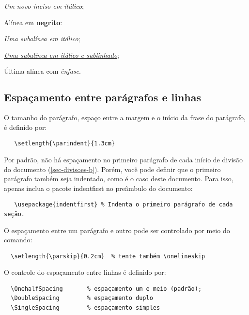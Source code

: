 \begin{alineas}
  \begin{incisos}
    \item \textit{Um novo inciso em itálico};
  \end{incisos}
  
  \item Alínea em \textbf{negrito}:
  
  \begin{subalineas}
    \item \textit{Uma subalínea em itálico};
    \item \underline{\textit{Uma subalínea em itálico e sublinhado}}; 
  \end{subalineas}
  
  \item Última alínea com \emph{ênfase}.
  
\end{alineas}

\subsection{Espaçamento entre parágrafos e linhas}\label{sec_espacamento}

O tamanho do parágrafo, espaço entre a margem
e o início da frase do parágrafo, é definido por:

\begin{verbatim}
   \setlength{\parindent}{1.3cm}
\end{verbatim}

Por padrão, não há espaçamento no
primeiro parágrafo de cada início de divisão do documento
(\autoref{sec-divisoes-b}). Porém, você pode definir que o primeiro parágrafo
também seja indentado, como é o caso deste documento. Para isso, apenas inclua o
pacote \textsf{indentfirst} no preâmbulo do documento:

\begin{verbatim}
   \usepackage{indentfirst} % Indenta o primeiro parágrafo de cada seção.
\end{verbatim}

O espaçamento entre um parágrafo e outro
pode ser controlado por meio do comando:

\begin{verbatim}
  \setlength{\parskip}{0.2cm}  % tente também \onelineskip
\end{verbatim}

O controle do espaçamento entre linhas é
definido por:
\begin{verbatim}
  \OnehalfSpacing       % espaçamento um e meio (padrão); 
  \DoubleSpacing        % espaçamento duplo
  \SingleSpacing        % espaçamento simples	
\end{verbatim}

